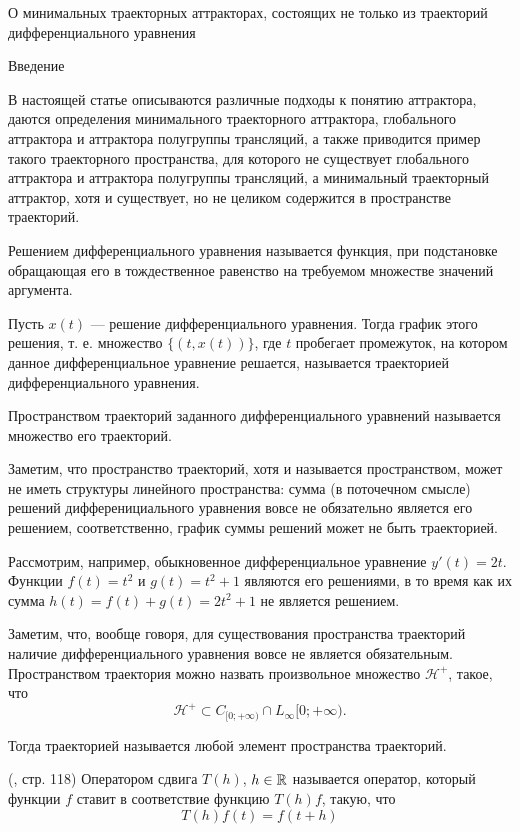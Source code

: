 
\LARGE




О минимальных траекторных аттракторах, состоящих не только из траекторий дифференциального уравнения

Введение


В настоящей статье описываются различные подходы к понятию аттрактора, даются определения минимального траекторного аттрактора, глобального аттрактора и аттрактора полугруппы трансляций, а также приводится пример такого траекторного пространства, для которого не существует глобального аттрактора и аттрактора полугруппы трансляций, а минимальный траекторный аттрактор, хотя и существует, но не целиком содержится в пространстве траекторий.


\opred
Решением дифференциального уравнения называется функция, при подстановке обращающая его в тождественное равенство на требуемом множестве значений аргумента.

\opred
Пусть $x(t)$ --- решение дифференциального уравнения.
Тогда график этого решения, т. е. множество $\{(t,x(t))\}$,
где $t$ пробегает промежуток, на котором данное дифференциальное уравнение решается,
называется траекторией дифференциального уравнения.

\opred
Пространством траекторий заданного дифференциального уравнений называется множество его траекторий.

Заметим, что пространство траекторий, хотя и называется пространством, может не иметь структуры линейного пространства:
сумма (в поточечном смысле) решений дифференициального уравнения вовсе не обязательно является его решением,
соответственно, график суммы решений может не быть траекторией.

Рассмотрим, например, обыкновенное дифференциальное уравнение $y'(t) = 2t$.
Функции $f(t)=t^2$ и $g(t)=t^2 +1$ являются его решениями, в то время как их сумма $h(t) = f(t) + g(t) = 2t^2 + 1$ не является решением.

Заметим, что, вообще говоря, для существования пространства траекторий наличие дифференциального уравнения вовсе не является обязательным.
Пространством траектория можно назвать произвольное множество $\mathcal{H}^+$, такое, что
$$
	\mathcal{H}^+ \subset C_{[0;+\infty)} \cap L_\infty{[0;+\infty)}.
$$

Тогда траекторией называется любой элемент пространства траекторий.



\opred (\cite{Zelenaya}, стр. 118)
Оператором сдвига $T(h)$, $h\in\mathbb{R}$ называется оператор, который функции $f$ ставит в соответствие функцию $T(h)f$, такую, что
$$
T(h)f(t)=f(t+h)
$$



